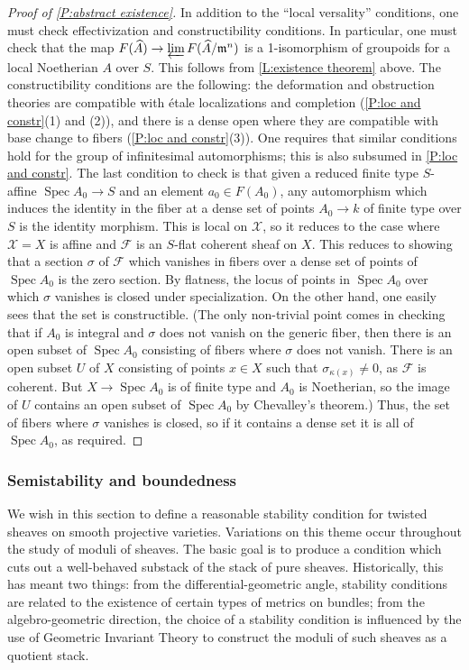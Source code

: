 \documentclass[11pt]{amsart}
\newcommand{\mf}[1]{\mathfrak #1}
\newcommand{\ms}[1]{\mathscr #1}
\newcommand{\spec}{\operatorname{Spec}}
\renewcommand{\[}{[\!\hspace{0.03em}[}
\renewcommand{\]}{]\!\hspace{0.03em}]}
\renewcommand{\(}{(\!\hspace{0.03em}(}
\renewcommand{\)}{)\!\hspace{0.03em})}
\newcommand{\invlim}{\varprojlim}
\theoremstyle{definition}
\theoremstyle{remark}
\begin{document}
\begin{proof}[Proof of \ref{P:abstract existence}]
In addition to the ``local versality'' conditions, one must check 
effectivization and constructibility conditions.  In particular, one 
must check that the map $F(\widehat A)\to\invlim F(\widehat A/\mf 
m^{n})$ is a 1-isomorphism of groupoids for a local Noetherian $A$ 
over $S$.  This follows from \ref{L:existence theorem} above.  The constructibility conditions are the 
following: the deformation and obstruction theories are compatible 
with \'etale localizations and completion (\ref{P:loc and constr}(1) 
and (2)), and there is a dense open where they are compatible with base 
change to fibers (\ref{P:loc and constr}(3)).  One requires that similar 
conditions hold for the group of infinitesimal automorphisms; this is 
also subsumed in \ref{P:loc and constr}.  The last condition to check 
is that given a reduced finite type $S$-affine $\spec A_{0}\to S$ and an 
element $a_{0}\in F(A_{0})$, any automorphism which induces the 
identity in the fiber at a dense set of points $A_{0}\to k$ of finite 
type over $S$ is the identity morphism.  This is local on $\ms X$, so 
it reduces to the case where $\ms X=X$ is affine and $\ms F$ is an $S$-flat 
coherent sheaf on $X$.  This reduces to showing that a section 
$\sigma$ of $\ms F$ which vanishes in fibers over a dense set of points of 
$\spec A_{0}$ is the zero 
section.  By flatness, the locus of points in $\spec A_{0}$ over 
which $\sigma$ vanishes is closed under specialization.  On the 
other hand, one easily sees that the set is constructible.  (The only 
non-trivial point comes in checking that if $A_{0}$ is integral and 
$\sigma$ does not vanish on the generic fiber, then 
there is an open subset of $\spec A_{0}$ consisting of fibers where 
$\sigma$ does not vanish.  There is an open subset $U$ of $X$ consisting 
of points $x\in X$ such that $\sigma_{\kappa(x)}\neq 0$, as $\ms F$ 
is coherent.  But $X\to\spec A_{0}$ is of finite type and $A_{0}$ is 
Noetherian, so the image of $U$ contains an open subset of $\spec A_{0}$ 
by Chevalley's theorem.)  Thus, the set of fibers where $\sigma$ 
vanishes is closed, so if it contains a dense set it is all of $\spec 
A_{0}$, as required.
\end{proof}


\subsubsection{Semistability and boundedness}\label{S:semistability}
We wish in this section to define a reasonable stability 
condition for twisted sheaves on smooth projective varieties.  
Variations on this theme occur throughout the study of moduli of 
sheaves.  The basic goal is to produce a condition which cuts out a 
well-behaved substack of the stack of pure sheaves.  Historically, 
this has meant two things: from the differential-geometric angle, 
stability conditions are related to the existence of certain 
types of metrics on bundles; from the algebro-geometric direction, 
the choice of a stability condition is influenced by the use of 
Geometric Invariant Theory to construct the moduli of such sheaves as 
a quotient stack.  
\end{document}
